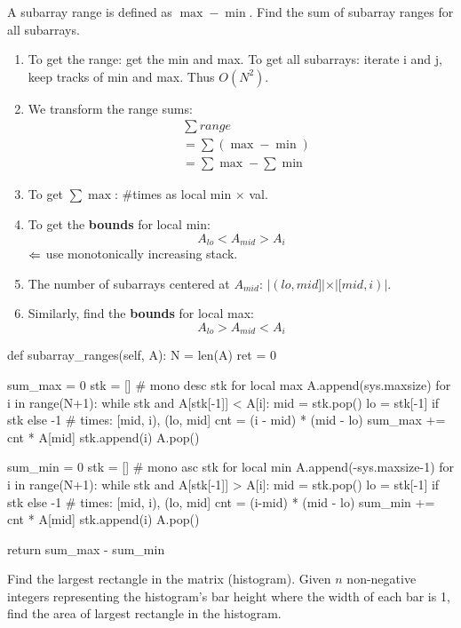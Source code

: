  A subarray range is defined as $\max - \min$. Find the sum of subarray ranges for all subarrays. 

\begin{enumerate}
\item To get the range: get the min and max. To get all subarrays: iterate i and j, keep tracks of min and max. Thus $O(N^2)$.
\item We transform the range sums:
\[
\begin{aligned}
&\sum{range} \\
&=\sum{(\max-\min)} \\
&=\sum{\max} - \sum{\min}
\end{aligned}
\]
\item To get $\sum{\max}$: \#times as local min $\times$ val. 
\item To get the \textbf{bounds} for local min: 
$$A_{lo} < A_{mid} > A_i$$ 
$\Leftarrow$ use monotonically increasing stack.
\item The number of subarrays centered at $A_{mid}$: $|(lo, mid]| \times |[mid, i)|$.
\item Similarly, find the \textbf{bounds} for local max:
$$A_{lo} > A_{mid} < A_i$$ 
\end{enumerate}
\begin{python}
def subarray_ranges(self, A):
    N = len(A)
    ret = 0

    sum_max = 0
    stk = []  # mono desc stk for local max
    A.append(sys.maxsize)
    for i in range(N+1):
        while stk and A[stk[-1]] < A[i]:
            mid = stk.pop()
            lo = stk[-1] if stk else -1
            # times: [mid, i), (lo, mid]
            cnt = (i - mid) * (mid - lo)
            sum_max += cnt * A[mid]
        stk.append(i)
    A.pop()

    sum_min = 0
    stk = []  # mono asc stk for local min
    A.append(-sys.maxsize-1)
    for i in range(N+1):
        while stk and A[stk[-1]] > A[i]:
            mid = stk.pop()
            lo = stk[-1] if stk else -1
            # times: [mid, i), (lo, mid]
            cnt = (i-mid) * (mid - lo)
            sum_min += cnt * A[mid]
        stk.append(i)
    A.pop()
    
    return sum_max - sum_min
\end{python}

 Find the largest rectangle in the matrix (histogram). Given $n$ non-negative integers representing the histogram's bar height where the width of each bar is 1, find the area of largest rectangle in the histogram. 

